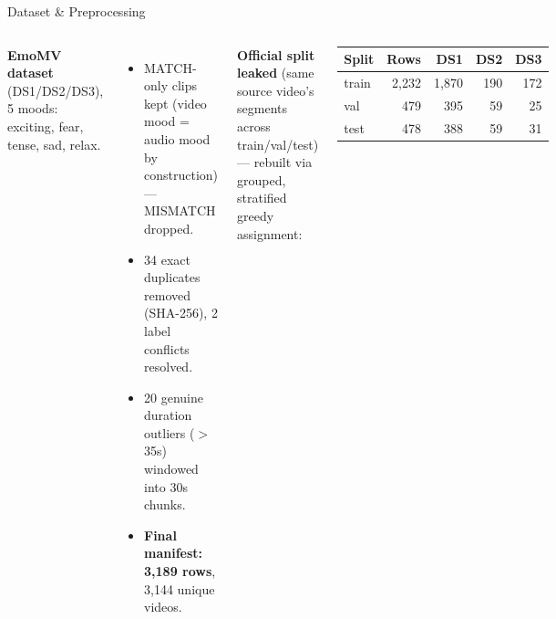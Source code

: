 \documentclass[aspectratio=169,11pt]{beamer}
\begin{document}
\begin{frame}{Dataset \& Preprocessing}
\begin{columns}
\textbf{EmoMV dataset} (DS1/DS2/DS3), 5 moods: exciting, fear, tense, sad, relax.
\begin{itemize}
  \item MATCH-only clips kept (video mood = audio mood by construction) --- MISMATCH dropped.
  \item 34 exact duplicates removed (SHA-256), 2 label conflicts resolved.
  \item 20 genuine duration outliers ($>$35s) windowed into 30s chunks.
  \item \textbf{Final manifest: 3{,}189 rows}, 3{,}144 unique videos.
\end{itemize}
\textbf{Official split leaked} (same source video's segments across train/val/test) --- rebuilt
via grouped, stratified greedy assignment:
\begin{center}
\begin{tabular}{@{}lrrrr@{}}
\toprule
Split & Rows & DS1 & DS2 & DS3 \\
\midrule
train & 2{,}232 & 1{,}870 & 190 & 172 \\
val & 479 & 395 & 59 & 25 \\
test & 478 & 388 & 59 & 31 \\
\bottomrule
\end{tabular}
\end{center}
\end{columns}
\end{frame}
\end{document}
